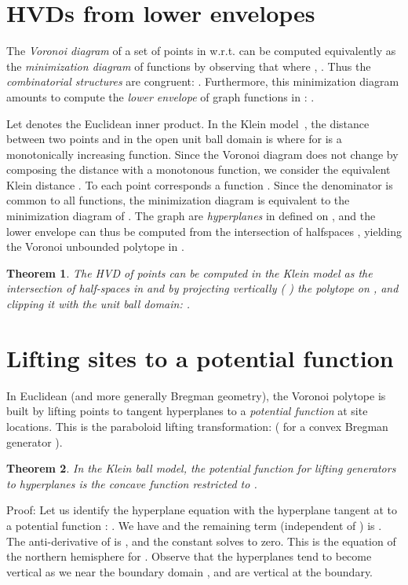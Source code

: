 \documentclass[12pt]{article}
\newtheorem{theorem}{Theorem}
\begin{document}
\section{HVDs from lower envelopes}


The {\em Voronoi diagram} of  a set  of  points  in  w.r.t.  can be computed equivalently as the {\em minimization diagram} of  functions by observing that
 where , .
Thus the {\em combinatorial structures} are congruent: .
Furthermore, this minimization diagram amounts to compute the {\em lower envelope} of  graph functions in :
 .

Let  denotes the Euclidean inner product.
In the Klein model~\cite{HVDeasy-2010}, the distance between two points  and  in the open unit ball domain   is  where
 for  is a monotonically increasing function.
Since the Voronoi diagram does not change by composing the distance with a monotonous function, we consider the equivalent Klein distance .
To each point  corresponds a function .
Since the denominator  is common to all functions, the minimization diagram is equivalent to the minimization diagram
of .
The graph  are {\em hyperplanes} in  defined on , and the lower envelope can thus be computed from the intersection of  halfspaces , yielding the Voronoi unbounded polytope in .

\begin{theorem}
The HVD of  points can be computed in the Klein model as the intersection of  half-spaces in  and by projecting vertically ( ) the polytope on , and clipping it with the unit ball domain: .
\end{theorem}




\section{Lifting sites to a potential function}


In Euclidean (and more generally Bregman geometry), the Voronoi polytope is built by lifting points to tangent hyperplanes to a {\em potential function}  at site locations. This is the paraboloid lifting transformation:   ( for a convex Bregman generator ).

\begin{theorem}
In the Klein ball model, the {\em potential function} for lifting generators to hyperplanes is the {\em concave} function 
 restricted to .
\end{theorem}

Proof:
Let us identify the  hyperplane equation  with
the hyperplane tangent at  to a potential function : 
.
We have  and the remaining term (independent of ) is .
The anti-derivative of  is , and the constant  solves to zero.
This is the equation  of the northern hemisphere for .
Observe that the hyperplanes tend to become vertical as we near the boundary domain , and are vertical at the boundary.
 
\end{document}
